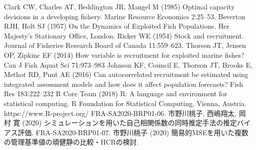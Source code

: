 \documentclass[11pt]{jsarticle}
\begin{document}
\begin{thebibliography}{9}
   Clark CW, Charles AT, Beddington JR, Mangel M (1985) Optimal capacity decisions in a developing fishery. Marine Resource Economics 2:25--53.
 Beverton RJH, Holt SJ (1957) On the Dynamics of Exploited Fish Populations. Her Majesty’s Stationary Office, London.
 Ricker WE (1954) Stock and recruitment. Journal of Fisheries Research Board of Canada 11:559--623.
 Thorson JT, Jensen OP, Zipkinc EF (2014) How variable is recruitment for exploited marine fishes? Can J Fish Aquat Sci 71:973--983
 Johnson KF, Council E, Thorson JT, Brooks E, Methot RD, Punt AE (2016) Can autocorrelated recruitment be estimated using integrated assessment models and how does it affect population forecasts? Fish Res 183:222--232
 R Core Team (2018) R: A language and environment for statistical computing. R Foundation for Statistical Computing, Vienna, Austria. https://www.R-project.org/
 FRA-SA2020-BRP01-06. 市野川桃子, 西嶋翔太, 岡村 寛 (2020) シミュレーションを用いた自己相関係数の同時推定手法の推定バイアス評価.
 FRA-SA2020-BRP01-07. 市野川桃子 (2020) 簡易的MSEを用いた複数の管理基準値の頑健静の比較・HCRの検討.
  

\end{thebibliography}
\end{document}
